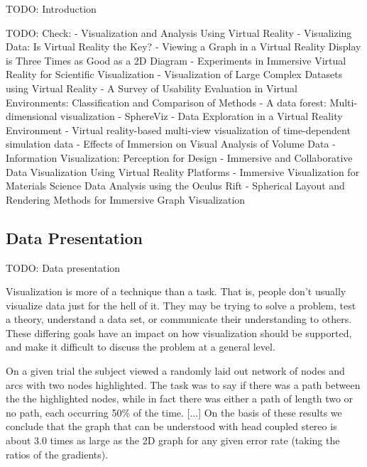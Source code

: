 TODO: Introduction

TODO: Check:
\cite{Ribarsky1994} - Visualization and Analysis Using Virtual Reality
\cite{Stone1994} - Visualizing Data: Is Virtual Reality the Key?
\cite{Ware1994} - Viewing a Graph in a Virtual Reality Display is Three Times as Good as a 2D Diagram
\cite{VanDam2002} - Experiments in Immersive Virtual Reality for Scientific Visualization
\cite{Sarathy2000} - Visualization of Large Complex Datasets using Virtual Reality
\cite{Bowman2002a} - A Survey of Usability Evaluation in Virtual Environments: Classification and Comparison of Methods
\cite{Jamieson2007} - A data forest: Multi-dimensional visualization
\cite{Soldati2007} - SphereViz - Data Exploration in a Virtual Reality Environment
\cite{Hentschel2009} - Virtual reality-based multi-view visualization of time-dependent simulation data
\cite{Laha2012} - Effects of Immersion on Visual Analysis of Volume Data
\cite{Ware2012} - Information Visualization: Perception for Design
\cite{Donalek2014} - Immersive and Collaborative Data Visualization Using Virtual Reality Platforms
\cite{Drouhard2015} - Immersive Visualization for Materials Science Data Analysis using the Oculus Rift
\cite{Kwon2015} - Spherical Layout and Rendering Methods for Immersive Graph Visualization




\subsection{Data Presentation}

TODO: Data presentation

Visualization is more of a technique than a task. That is, people don't usually visualize data just for the hell of it. They may be trying to solve a problem, test a theory, understand a data set, or communicate their understanding to others. These differing goals have an impact on how visualization should be supported, and make it difficult to discuss the problem at a general level. 
\cite{Stone1994}

On a given trial the subject viewed a randomly laid out network of nodes and arcs with two nodes highlighted. The task was to say if there was a path between the the highlighted nodes, while in fact there was either a path of length two or no path, each occurring 50\% of the time. [...]
On the basis of these results we conclude that the graph that can be understood with head coupled stereo is about 3.0 times as large as the 2D graph for any given error rate (taking the ratios of the gradients).
\cite{Ware1994}

